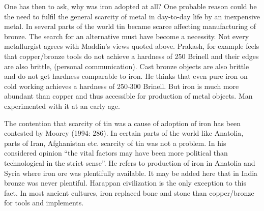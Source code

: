 One has then to ask, why was iron adopted at all? One probable reason could be the need to fulfil the general scarcity of metal in day-to-day life by an inexpensive metal. In several parts of the world tin became scarce affecting manufacturing of bronze. The search for an alternative must have become a necessity. Not every metallurgist agrees with Maddin's views quoted above. Prakash, for example feels that copper/bronze tools do not achieve a hardness of 250 Brinell and their edges are also brittle, (personal communication). Cast bronze objects are also brittle and do not get hardness comparable to iron. He thinks that even pure iron on cold working achieves a hardness of 250-300 Brinell. But iron is much more abundant than copper and thus accessible for production of metal objects. Man experimented with it at an early age.


The contention that scarcity of tin was a cause of adoption of iron has been contested by Moorey (1994: 286). In certain parts of the world like Anatolia, parts of Iran, Afghanistan etc. scarcity of tin was not a problem. In his considered opinion “the vital factors may have been more political than technological in the strict sense”. He refers to production of iron in Anatolia and Syria where iron ore was plentifully available. It may be added here that in India bronze was never plentiful. Harappan civilization is the only exception to this fact. In most ancient cultures, iron replaced bone and stone than copper/bronze for tools and implements.


